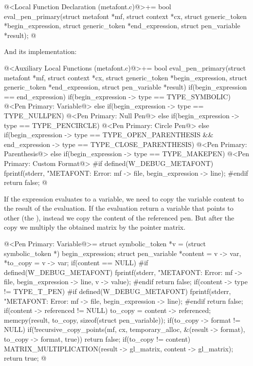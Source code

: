 {{{{{\iniciocodigo
@<Local Function Declaration (metafont.c)@>+=
bool eval_pen_primary(struct metafont *mf, struct context *cx,
                      struct generic_token *begin_expression,
                      struct generic_token *end_expression,
                      struct pen_variable *result);
@
\fimcodigo

And its implementation:

\iniciocodigo
@<Auxiliary Local Functions (metafont.c)@>+=
bool eval_pen_primary(struct metafont *mf, struct context *cx,
                      struct generic_token *begin_expression,
                      struct generic_token *end_expression,
                      struct pen_variable *result){
  if(begin_expression == end_expression){
    if(begin_expression -> type == TYPE_SYMBOLIC){
      @<Pen Primary: Variable@>
    }
    else if(begin_expression -> type == TYPE_NULLPEN){
      @<Pen Primary: Null Pen@>
    }
    else if(begin_expression -> type == TYPE_PENCIRCLE){
      @<Pen Primary: Circle Pen@>
    }
  }
  else{
    if(begin_expression -> type == TYPE_OPEN_PARENTHESIS &&
      end_expression -> type == TYPE_CLOSE_PARENTHESIS){
      @<Pen Primary: Parenthesis@>
    }
    else if(begin_expression -> type == TYPE_MAKEPEN){
      @<Pen Primary: Custom Format@>
    }
  }
#if defined(W_DEBUG_METAFONT)
  fprintf(stderr, "METAFONT: Error: %
          mf -> file, begin_expression -> line);
#endif
  return false;
}
@
\fimcodigo

If the expression evaluates to a variable, we need to copy the
variable content to the result of the evaluation. If the evaluation
return a variable that points to other (the ),
instead we copy the content of the referenced pen. But after the copy
we multiply the obtained matrix by the pointer matrix.

\iniciocodigo
@<Pen Primary: Variable@>=
struct symbolic_token *v = (struct symbolic_token *) begin_expression;
struct pen_variable *content = v -> var, *to_copy = v -> var;
if(content == NULL){
#if defined(W_DEBUG_METAFONT)
  fprintf(stderr, "METAFONT: Error: %
          mf -> file, begin_expression -> line, v -> value);
#endif
  return false;
}
if(content -> type != TYPE_T_PEN){
#if defined(W_DEBUG_METAFONT)
  fprintf(stderr, "METAFONT: Error: %
          mf -> file, begin_expression -> line);
#endif
  return false;
}
if(content -> referenced != NULL)
  to_copy = content -> referenced;
memcpy(result, to_copy, sizeof(struct pen_variable));
if(to_copy -> format != NULL)
  if(!recursive_copy_points(mf, cx, temporary_alloc, &(result -> format),
                            to_copy -> format, true))
    return false;
if(to_copy != content)
  MATRIX_MULTIPLICATION(result -> gl_matrix, content -> gl_matrix);
return true;
@
\fimcodigo

}}}}}
